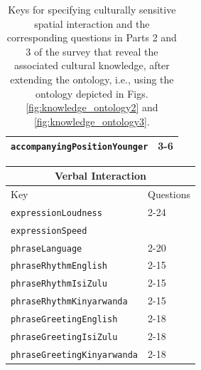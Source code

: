\documentclass{CSSRforAfrica}
\begin{document}
\begin{table}[H]
\begin{center}
\begin{tabular}{|l l|}
{\footnotesize \verb+accompanyingPositionYounger+} 	   & {\footnotesize 3-6\verb++}\\
\hline \hline
\end{tabular}
\end{center}
\caption{Keys for specifying culturally sensitive spatial interaction and the corresponding questions in Parts 2 and 3 of the survey that reveal the associated cultural knowledge, after extending the ontology, i.e., using the ontology depicted in Figs. \ref{fig:knowledge_ontology2} and \ref{fig:knowledge_ontology3}.}
\label{table:key-value_questions_spatial}
\end{table}

\begin{table}[H]
\begin{center}
\begin{tabular}{|l l|}
\hline \hline
\multicolumn{2}{|c|}{{\small \bf Verbal Interaction}} \\
\hline \hline
 {\small  Key  }                                         &  {\small Questions }      \\
\hline
{\footnotesize \verb+expressionLoudness+} 	           & {\footnotesize 2-24} \vspace{-1mm}\\
{\footnotesize \verb+expressionSpeed+} 	            & {\footnotesize \verb++} \vspace{-1mm}\\
{\footnotesize \verb+phraseLanguage+} 	           & {\footnotesize 2-20} \vspace{-1mm}\\
{\footnotesize \verb+phraseRhythmEnglish+} 	           & {\footnotesize 2-15 } \vspace{-1mm}\\
{\footnotesize \verb+phraseRhythmIsiZulu+} 	           & {\footnotesize 2-15 } \vspace{-1mm}\\
{\footnotesize \verb+phraseRhythmKinyarwanda+} 	           & {\footnotesize 2-15 } \vspace{-1mm}\\
{\footnotesize \verb+phraseGreetingEnglish+} 	           & {\footnotesize  2-18} \vspace{-1mm}\\
{\footnotesize \verb+phraseGreetingIsiZulu+} 	           & {\footnotesize  2-18} \vspace{-1mm}\\
{\footnotesize \verb+phraseGreetingKinyarwanda+} 	           & {\footnotesize  2-18} \vspace{-1mm}\\

\end{tabular}
\end{center}
\end{table}
\end{document}
